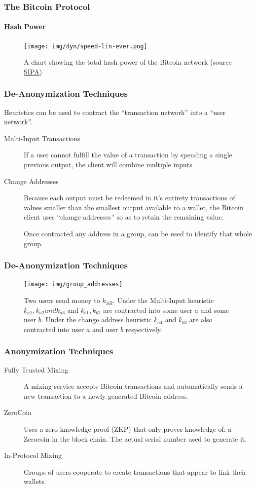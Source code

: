 \documentclass{beamer}
\begin{document}
\begin{frame}
\frametitle{The Bitcoin Protocol}
\framesubtitle{Hash Power}
\begin{figure}[h!]
    \centering
    \texttt{[image: img/dyn/speed-lin-ever.png]}
    \caption{A chart showing the total hash power of the Bitcoin network (source \href{http://bitcoin.sipa.be/speed-lin-ever.png}{SIPA})}
    \label{fig:blockchain}
\end{figure}
\end{frame}

\begin{frame}
\frametitle{De-Anonymization Techniques}
Heuristics can be used to contract the ``transaction network'' into a ``user network''.
\begin{description}
\item[Multi-Input Transactions] If a user cannot fulfill the value of a transaction by spending a  single previous output, the client will combine multiple inputs\cite{reid-anon}.
\item[Change Addresses] Because each output must be redeemed in it's entirety transactions of values smaller than the smallest output available to a wallet, the Bitcoin client uses ``change addresses'' so as to retain the remaining value.

Once contracted any address in a group, can be used to identify that whole group.

\end{description}
\end{frame}

\begin{frame}
\frametitle{De-Anonymization Techniques}
\begin{figure}[h!]
    \centering
    \texttt{[image: img/group\_addresses]}
    \caption{Two users send money to $k_{SR}$. Under the Multi-Input  heuristic $k_{a1}, k_{a2} and k_{a3}$ and $k_{b1}, k_{b2}$ are contracted into  some user $a$ and some user $b$. Under the change address heuristic  $k_{a4}$ and $k_{b3}$ are also contracted into user $a$ and user $b$  respectively. }
    \label{fig:blockchain}
\end{figure}
\end{frame}


\begin{frame}
\frametitle{Anonymization Techniques}
\begin{description}
\item[Fully Trusted Mixing]
A mixing service accepts Bitcoin transactions and automatically sends a new transaction to a newly generated Bitcoin address.
\item[ZeroCoin]
Uses a zero knowledge proof (ZKP) that only proves knowledge of: a Zerocoin in the block chain. The actual serial number used to generate it\cite{zerocoin}.

\item[In-Protocol Mixing]
Groups of users cooperate to create transactions that appear to link their wallets.
\end{description}
\end{frame}
\end{document}
